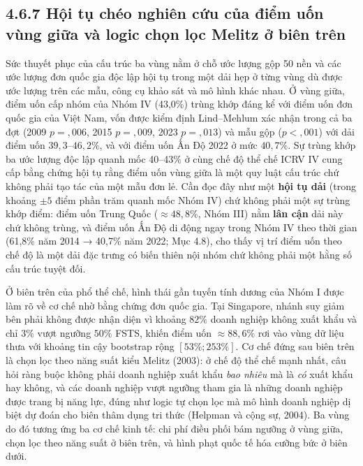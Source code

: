 \documentclass[
  a4paper,
  13pt]{extreport}
\begin{document}
\hypertarget{hux1ed9i-tux1ee5-chuxe9o-nghiuxean-cux1ee9u-cux1ee7a-ux111iux1ec3m-uux1ed1n-vuxf9ng-giux1eefa-vuxe0-logic-chux1ecdn-lux1ecdc-melitz-ux1edf-biuxean-truxean}{%
\subsection{4.6.7 Hội tụ chéo nghiên cứu của điểm uốn vùng giữa và logic
chọn lọc Melitz ở biên
trên}\label{hux1ed9i-tux1ee5-chuxe9o-nghiuxean-cux1ee9u-cux1ee7a-ux111iux1ec3m-uux1ed1n-vuxf9ng-giux1eefa-vuxe0-logic-chux1ecdn-lux1ecdc-melitz-ux1edf-biuxean-truxean}}

Sức thuyết phục của cấu trúc ba vùng nằm ở chỗ ước lượng gộp 50 nền và
các ước lượng đơn quốc gia độc lập hội tụ trong một dải hẹp ở từng vùng
dù được ước lượng trên các mẫu, công cụ khảo sát và mô hình khác nhau. Ở
vùng giữa, điểm uốn cấp nhóm của Nhóm IV (43,0\%) trùng khớp đáng kể với
điểm uốn đơn quốc gia của Việt Nam, vốn được kiểm định Lind--Mehlum xác
nhận trong cả ba đợt (2009 \(p = {,}006\), 2015 \(p = {,}009\), 2023
\(p = {,}013\)) và mẫu gộp (\(p < {,}001\)) với dải điểm uốn
\(39{,}3\)--\(46{,}2\%\), và với điểm uốn Ấn Độ 2022 ở mức \(40{,}7\%\).
Sự trùng khớp ba ước lượng độc lập quanh mốc 40--43\% ở cùng chế độ thể
chế ICRV IV cung cấp bằng chứng hội tụ rằng điểm uốn vùng giữa là một
quy luật cấu trúc chứ không phải tạo tác của một mẫu đơn lẻ. Cần đọc đây
như một \textbf{hội tụ dải} (trong khoảng \(\pm 5\) điểm phần trăm quanh
mốc Nhóm IV) chứ không phải một sự trùng khớp điểm: điểm uốn Trung Quốc
(\(\approx 48{,}8\%\), Nhóm III) nằm \textbf{lân cận} dải này chứ không
trùng, và điểm uốn Ấn Độ di động ngay trong Nhóm IV theo thời gian
(61,8\% năm 2014 → 40,7\% năm 2022; Mục 4.8), cho thấy vị trí điểm uốn
theo chế độ là một dải đặc trưng có biến thiên nội nhóm chứ không phải
một hằng số cấu trúc tuyệt đối.

Ở biên trên của phổ thể chế, hình thái gần tuyến tính dương của Nhóm I
được làm rõ về cơ chế nhờ bằng chứng đơn quốc gia. Tại Singapore, nhánh
suy giảm bên phải không được nhận diện vì khoảng \(82\%\) doanh nghiệp
không xuất khẩu và chỉ \(3\%\) vượt ngưỡng \(50\%\) FSTS, khiến điểm uốn
\(\approx 88{,}6\%\) rơi vào vùng dữ liệu thưa với khoảng tin cậy
bootstrap rộng \([53\%; 253\%]\). Cơ chế đứng sau biên trên là chọn lọc
theo năng suất kiểu Melitz (2003): ở chế độ thể chế mạnh nhất, câu hỏi
ràng buộc không phải doanh nghiệp xuất khẩu \emph{bao nhiêu} mà là
\emph{có} xuất khẩu hay không, và các doanh nghiệp vượt ngưỡng tham gia
là những doanh nghiệp được trang bị năng lực, đúng như logic tự chọn lọc
mà mô hình doanh nghiệp dị biệt dự đoán cho biên thâm dụng tri thức
(Helpman và cộng sự, 2004). Ba vùng do đó tương ứng ba cơ chế kinh tế:
chi phí điều phối bám ngưỡng ở vùng giữa, chọn lọc theo năng suất ở biên
trên, và hình phạt quốc tế hóa cưỡng bức ở biên dưới.
\end{document}
